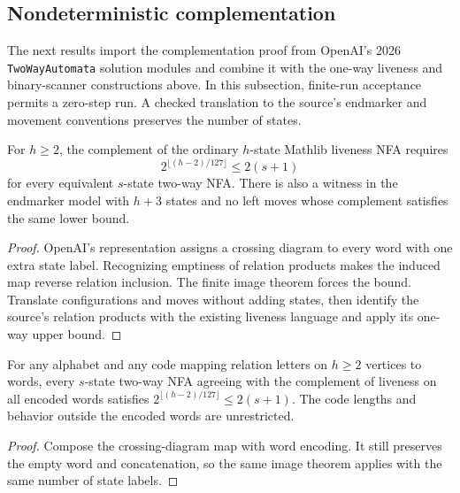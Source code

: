 \subsection{Nondeterministic complementation}

The next results import the complementation proof from OpenAI's 2026
\texttt{TwoWayAutomata} solution modules and combine it with the one-way
liveness and binary-scanner constructions above. In this subsection,
finite-run acceptance permits a zero-step run. A checked translation to the
source's endmarker and movement conventions preserves the number of states.

\begin{theorem}
  \label{thm:models-liveness-complement-lower}
  \leanok
  For $h\ge2$, the complement of the ordinary $h$-state Mathlib liveness
  NFA requires
  \[
    2^{\lfloor(h-2)/127\rfloor}\le2(s+1)
  \]
  for every equivalent $s$-state two-way NFA. There is also a witness in
  the endmarker model with $h+3$ states and no left moves whose complement
  satisfies the same lower bound.
\end{theorem}
\begin{proof}
  \leanok
  OpenAI's representation assigns a crossing diagram to every word with one
  extra state label. Recognizing emptiness of relation products makes the
  induced map reverse relation inclusion. The finite image theorem forces
  the bound. Translate configurations and moves without adding states,
  then identify the source's relation products with the existing liveness
  language and apply its one-way upper bound.
\end{proof}

\begin{corollary}
  \label{cor:models-encoded-complement-lower}
  \leanok
  For any alphabet and any code mapping relation letters on $h\ge2$
  vertices to words, every $s$-state two-way NFA agreeing with the complement
  of liveness on all encoded words satisfies
  $2^{\lfloor(h-2)/127\rfloor}\le2(s+1)$.
  The code lengths and behavior outside the encoded words are unrestricted.
\end{corollary}
\begin{proof}
  \leanok
  Compose the crossing-diagram map with word encoding. It still preserves
  the empty word and concatenation, so the same image theorem applies with
  the same number of state labels.
\end{proof}

